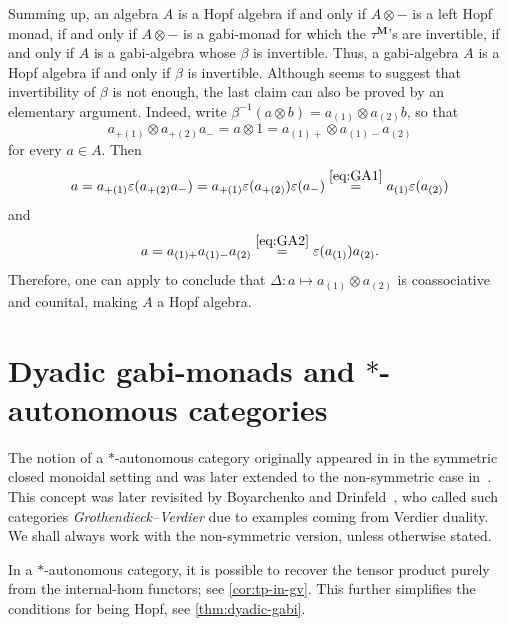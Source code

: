 \documentclass[12pt,dvipsnames,oneside]{amsart}
\theoremstyle{plain}
\theoremstyle{remark}
\theoremstyle{definition}
\newcommand*{\blank}{{-}}
\begin{document}
Summing up, an algebra \(A\) is a Hopf algebra if and only if \(A \otimes \blank\) is a left Hopf monad, if and only if \(A \otimes \blank\) is a gabi-monad for which the \(\tau^{\boldsymbol{M}}\)'s are invertible, if and only if \(A\) is a gabi-algebra whose \(\beta\) is invertible. Thus, a gabi-algebra \(A\) is a Hopf algebra if and only if \(\beta\) is invertible. Although \cite[\S5.3]{Berger-Vercruysse-Saracco} seems to suggest that invertibility of \(\beta\) is not enough, the last claim can also be proved by an elementary argument. Indeed, write \(\beta^{-1}(a \otimes b) = a_{(1)} \otimes a_{(2)}b\), so that
\[
  a_{+(1)} \otimes a_{+(2)}a_- = a \otimes 1 = a_{(1)+} \otimes a_{(1)-}a_{(2)}
\]
for every \(a \in A\). Then
\[a = a_{+(1)} \varepsilon( a_{+(2)}a_-) = a_{+(1)} \varepsilon( a_{+(2)})\varepsilon(a_-)  \stackrel{\eqref{eq:GA1}}{=} a_{(1)} \varepsilon( a_{(2)}) \]
and
\[a = a_{(1)+} a_{(1)-}a_{(2)} \stackrel{\eqref{eq:GA2}}{=} \varepsilon(a_{(1)})a_{(2)}.\]
Therefore, one can apply \cite[Theorem 5.3]{Berger-Vercruysse-Saracco} to conclude that \(\Delta \colon a \mapsto a_{(1)} \otimes a_{(2)}\) is coassociative and counital, making \(A\) a Hopf algebra.
















\section{Dyadic gabi-monads and \(*\)-autonomous categories}\label{sec:dyadic-gabi}

The notion of a \(*\)-autonomous category originally appeared in \cite{Barr-autonomous} in the symmetric closed monoidal setting and was later extended to the non-symmetric case in~\cite{Barr-nonsymmetric-autonomous}.
This concept was later revisited by Boyarchenko and Drinfeld~\cite{Boyarchenko-Drinfeld}, who called such categories \emph{Grothendieck--Verdier} due to examples coming from Verdier duality.
We shall always work with the non-symmetric version, unless otherwise stated.

In a \(*\)-autonomous category, it is possible to recover the tensor product purely from the internal-hom functors; see \cref{cor:tp-in-gv}.
This further simplifies the conditions for being Hopf, see \cref{thm:dyadic-gabi}.
\end{document}
